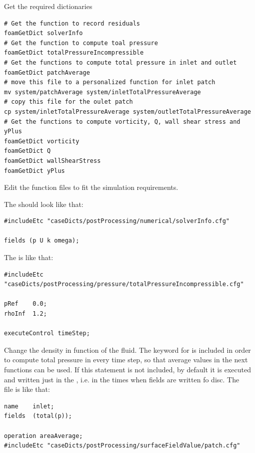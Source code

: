 \documentclass[
    parskip=half,      %
    DIV=12,            %
    headings=normal,   %
    fontsize=11pt,     %
    english            %
]{scrartcl}
\begin{document}
Get the required dictionaries

\begin{lstlisting}[style=terminal]
# Get the function to record residuals
foamGetDict solverInfo
# Get the function to compute toal pressure
foamGetDict totalPressureIncompressible
# Get the functions to compute total pressure in inlet and outlet
foamGetDict patchAverage
# move this file to a personalized function for inlet patch
mv system/patchAverage system/inletTotalPressureAverage
# copy this file for the oulet patch
cp system/inletTotalPressureAverage system/outletTotalPressureAverage
# Get the functions to compute vorticity, Q, wall shear stress and yPlus
foamGetDict vorticity
foamGetDict Q
foamGetDict wallShearStress
foamGetDict yPlus
\end{lstlisting} 

Edit the function files to fit the simulation requirements. 

The  should look like that:

\begin{lstlisting}
#includeEtc "caseDicts/postProcessing/numerical/solverInfo.cfg"

fields (p U k omega);
\end{lstlisting} 

The  is like that:
\begin{lstlisting}
#includeEtc "caseDicts/postProcessing/pressure/totalPressureIncompressible.cfg"

pRef    0.0;
rhoInf  1.2;

executeControl timeStep;
\end{lstlisting}

Change the density in function of the fluid. The keyword for  is included in order to compute total pressure in every time step, so that average values in the next
functions can be used. If this statement is not included, by default it is executed and written just in the , i.e. in the times when fields are written fo disc.
The \\
 file
is like that:

\begin{lstlisting}
name    inlet;
fields  (total(p));

operation areaAverage;
#includeEtc "caseDicts/postProcessing/surfaceFieldValue/patch.cfg"
\end{lstlisting} 
\end{document}
